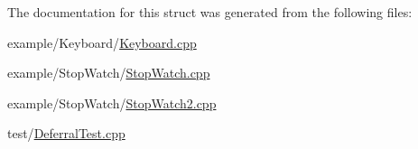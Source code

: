The documentation for this struct was generated from the following files\+:\begin{DoxyCompactItemize}
\item 
example/\+Keyboard/\mbox{\hyperlink{_keyboard_8cpp}{Keyboard.\+cpp}}\item 
example/\+Stop\+Watch/\mbox{\hyperlink{_stop_watch_8cpp}{Stop\+Watch.\+cpp}}\item 
example/\+Stop\+Watch/\mbox{\hyperlink{_stop_watch2_8cpp}{Stop\+Watch2.\+cpp}}\item 
test/\mbox{\hyperlink{_deferral_test_8cpp}{Deferral\+Test.\+cpp}}\end{DoxyCompactItemize}

